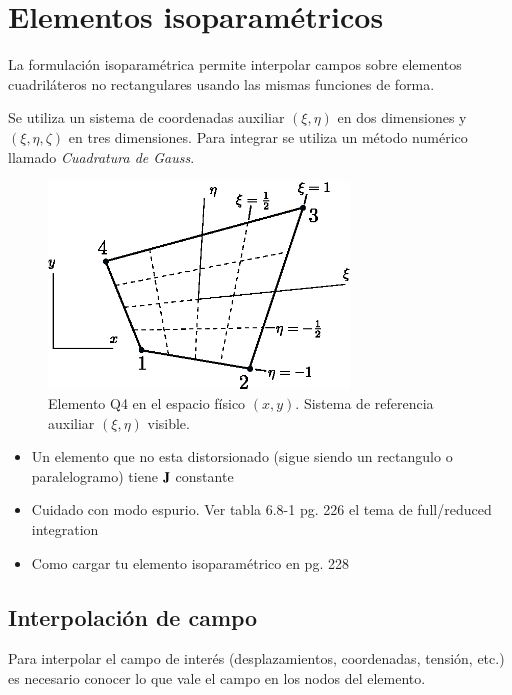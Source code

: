 \section{Elementos isoparamétricos}
La formulación isoparamétrica permite interpolar campos sobre elementos cuadriláteros no rectangulares usando las mismas funciones de forma.

Se utiliza un sistema de coordenadas auxiliar $(\xi,\eta)$ en dos dimensiones y $(\xi,\eta,\zeta)$ en tres dimensiones. Para integrar se utiliza un método numérico llamado \textit{Cuadratura de Gauss}.



\begin{figure}
	\centering
	\includegraphics[width=8cm]{fig/q4isoparam.eps}
	\caption{Elemento Q4 en el espacio físico $(x,y)$. Sistema de referencia auxiliar $(\xi,\eta)$ visible. 
	}
	\label{fig:q4isoparam}
\end{figure}

\begin{itemize}
	\item Un elemento que no esta distorsionado (sigue siendo un rectangulo o paralelogramo) tiene $\jac$ constante
	\item Cuidado con modo espurio. Ver tabla 6.8-1 pg. 226 el tema de full/reduced integration \cite{cook2007concepts}
	\item Como cargar tu elemento isoparamétrico en pg. 228
\end{itemize}


\subsection*{Interpolación de campo}

Para interpolar el campo de interés (desplazamientos, coordenadas, tensión, etc.) es necesario conocer lo que vale el campo en los nodos del elemento.

